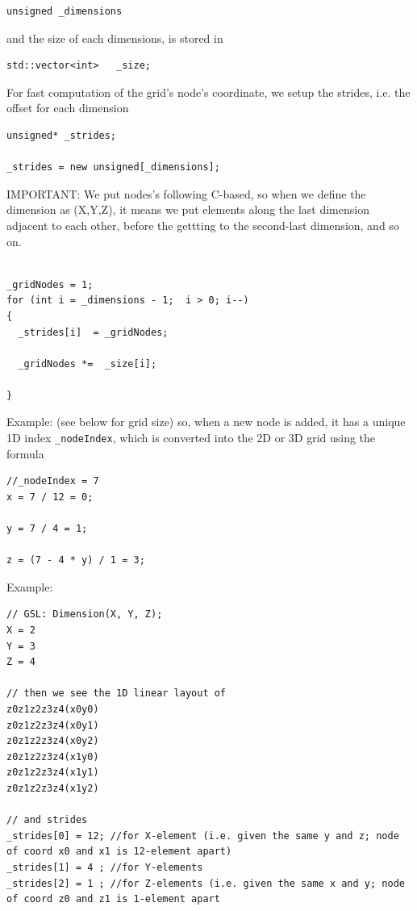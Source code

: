 \begin{enumerate}
\begin{verbatim}
unsigned _dimensions
\end{verbatim}  
and the size of each dimensions, is stored in 
\begin{verbatim}
std::vector<int>   _size;
\end{verbatim}


  For fast computation of the grid's node's coordinate, we setup the strides,
  i.e. the offset for each dimension

\begin{verbatim}
unsigned* _strides;

_strides = new unsigned[_dimensions];
\end{verbatim}

IMPORTANT: We put nodes's following C-based, so when we define the dimension as
(X,Y,Z), it means we put elements along the last dimension adjacent to each
other, before the gettting to the second-last dimension, and so on.
\begin{verbatim}

_gridNodes = 1;
for (int i = _dimensions - 1;  i > 0; i--)
{
  _strides[i]  = _gridNodes;
  
  _gridNodes *=  _size[i];

}
\end{verbatim}


Example: (see below for grid size) so, when a new node is added, it has a unique
1D index \verb!_nodeIndex!, which is converted into the 2D or 3D grid using the
formula
\begin{verbatim}
//_nodeIndex = 7
x = 7 / 12 = 0;

y = 7 / 4 = 1;

z = (7 - 4 * y) / 1 = 3;

\end{verbatim}

Example:
\begin{verbatim}
// GSL: Dimension(X, Y, Z);
X = 2
Y = 3
Z = 4

// then we see the 1D linear layout of 
z0z1z2z3z4(x0y0)
z0z1z2z3z4(x0y1)
z0z1z2z3z4(x0y2)
z0z1z2z3z4(x1y0)
z0z1z2z3z4(x1y1)
z0z1z2z3z4(x1y2)

// and strides
_strides[0] = 12; //for X-element (i.e. given the same y and z; node of coord x0 and x1 is 12-element apart)
_strides[1] = 4 ; //for Y-elements
_strides[2] = 1 ; //for Z-elements (i.e. given the same x and y; node of coord z0 and z1 is 1-element apart
\end{verbatim}


\end{enumerate}
